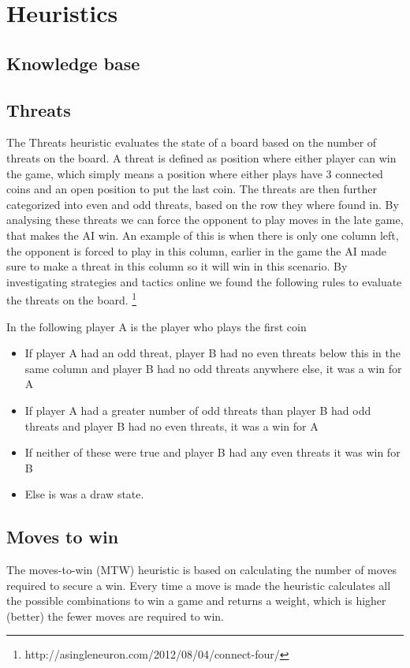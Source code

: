\documentclass[a4paper, titlepage]{article}
\begin{document}
\section*{Heuristics}
\subsection*{Knowledge base}


\subsection*{Threats}
The Threats heuristic evaluates the state of a board based on the number of threats on 
the board. 
A threat is defined as position where either player can win the game, which simply means a 
position where either plays have 3 connected coins and an open position to put the last coin. 
The threats are then further categorized into even and odd threats, based on the row they 
where found in. By analysing these threats we can force the opponent to play moves in the 
late game, that makes the AI win. An example of this is when there is only one column left, 
the opponent is forced to play in this column, earlier in the game the AI made sure to make a 
threat in this column so it will win in this scenario. By investigating strategies and tactics 
online we found the following rules to evaluate the threats on the board.
\footnote{http://asingleneuron.com/2012/08/04/connect-four/}

In the following player A is the player who plays the first coin
\begin{itemize} 
	\item If player A had an odd threat, player B had no even threats below this in the same column and player B had no odd threats anywhere else, it was a win for A
	\item If player A had a greater number of odd threats than player B had odd threats and player B had no even threats, it was a win for A	
	\item If neither of these were true and player B had any even threats it was win for B
	\item Else is was a draw state.
\end{itemize} 

\subsection*{Moves to win}
The moves-to-win (MTW) heuristic is based on calculating the number of moves required to 
secure a win. Every time a move is made the heuristic calculates all the possible 
combinations to win a game and returns a weight, which is higher (better) the fewer
moves are required to win. 
\end{document}
